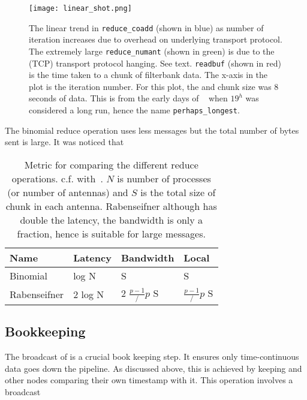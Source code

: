 \begin{figure}
	\label{fig:linearshot}
	\centering
	\texttt{[image: linear\_shot.png]}
	\caption{The linear trend in \texttt{reduce\_coadd} (shown in blue) as number of iteration increases due to overhead on underlying transport protocol.
		The extremely large \texttt{reduce_numant} (shown in green) is due to the (TCP) transport protocol hanging. See text.
		\texttt{readbuf} (shown in red) is the time taken to a chunk of filterbank data. 
		The x-axis in the plot is the iteration number. For this plot, the  and chunk size was $8$ seconds of data. 
		This is from the early days of \vf~ when $19^h$ was considered a long run, hence the name \texttt{perhaps\_longest}.
	 }
\end{figure}

\par The binomial reduce operation uses less messages but the total number of bytes sent is large. 
It was noticed that 

\begin{table}
\end{table}
\begin{table}[]
	\label{tab:reducemetric}
	\begin{tabular}{@{}llll@{}}
		\toprule
		Name & Latency & Bandwidth & Local \\ \midrule
		Binomial & log N & S & S \\
		Rabenseifner & 2 log N & 2 $\frac{p-1}/p$ S & $\frac{p-1}/p$ S \\ \bottomrule
	\end{tabular}
	\caption{Metric for comparing the different reduce operations. c.f. with~\cite{raben}.
		$N$ is number of processes (or number of antennas) and $S$ is the total size of chunk in each antenna.
		Rabenseifner although has double the latency, the bandwidth is only a fraction, hence is suitable for large messages.
	}
\end{table}

\subsection{Bookkeeping}
\label{ssub:bcast}


\par The broadcast of \mjd is a crucial book keeping step. It ensures only time-continuous data goes down the pipeline. 
As discussed above, this is achieved by \root keeping \mjd and other nodes comparing their own timestamp with it.
This operation involves a broadcast

